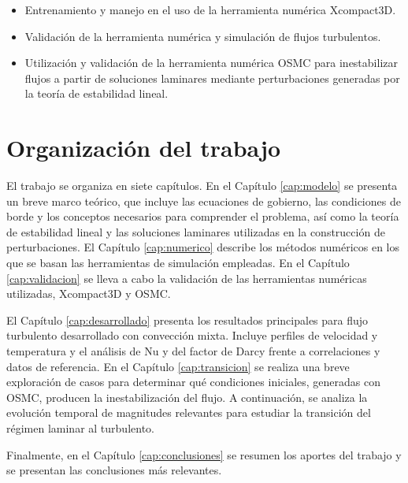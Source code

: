 \begin{itemize}

	\item Entrenamiento y manejo en el uso de la herramienta numérica Xcompact3D.
	
	\item Validación de la herramienta numérica y simulación de flujos turbulentos.

	\item Utilización y validación de la herramienta numérica OSMC \cite{szuban2023} para inestabilizar flujos a partir de soluciones laminares mediante perturbaciones \linebreak generadas por la teoría de estabilidad lineal.

\end{itemize}

\section{Organización del trabajo}

El trabajo se organiza en siete capítulos. En el Capítulo \ref{cap:modelo} se presenta un breve marco teórico, que incluye las ecuaciones de gobierno, las condiciones de borde y los conceptos necesarios para comprender el problema, así como la teoría de estabilidad lineal y las soluciones laminares utilizadas en la construcción de perturbaciones. El Capítulo \ref{cap:numerico} describe los métodos numéricos en los que se basan las herramientas de simulación empleadas. En el Capítulo \ref{cap:validacion} se lleva a cabo la validación de las herramientas numéricas utilizadas, Xcompact3D y OSMC.

El Capítulo \ref{cap:desarrollado} presenta los resultados principales para flujo turbulento desarrollado con convección mixta. Incluye perfiles de velocidad y temperatura y el análisis de Nu y del factor de Darcy frente a correlaciones y datos de referencia. En el Capítulo \ref{cap:transicion} se realiza una breve exploración de casos para determinar qué condiciones iniciales, generadas con OSMC, producen la inestabilización del flujo. A continuación, se analiza la evolución temporal de magnitudes relevantes para estudiar la transición del régimen laminar al turbulento.

Finalmente, en el Capítulo \ref{cap:conclusiones} se resumen los aportes del trabajo y se presentan las conclusiones más relevantes.